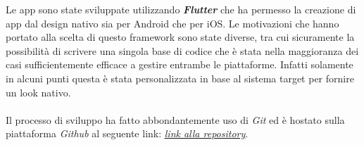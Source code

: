 Le app sono state sviluppate utilizzando \emph{\textbf{Flutter}} che ha permesso la creazione di app dal design nativo sia per Android che per iOS. Le motivazioni che hanno portato alla scelta di questo framework sono state diverse, tra cui sicuramente la possibilità di scrivere una singola base di codice che è stata nella maggioranza dei casi sufficientemente efficace a gestire entrambe le piattaforme. Infatti solamente in alcuni punti questa è stata personalizzata in base al sistema target per fornire un look nativo.
\\~\\
Il processo di sviluppo ha fatto abbondantemente uso di \emph{Git} ed è hostato sulla piattaforma \emph{Github} al seguente link: \href{https://github.com/AlessioLuciani/GuideMe}{\underline{\emph{link alla repository}}}.